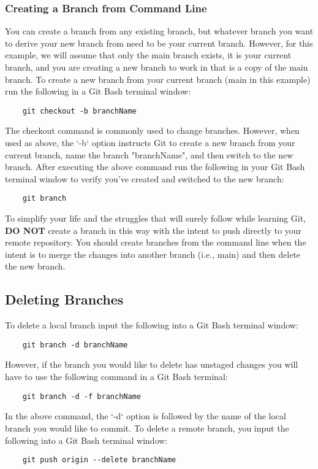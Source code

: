 \documentclass{article}
\begin{document}
\subsubsection*{Creating a Branch from Command Line}
You can create a branch from any existing branch, but whatever branch you want to derive your new branch from need to be your current branch. However, for this example, we will assume that only the main branch exists, it is your current branch, and you are creating a new branch to work in that is a copy of the main branch. To create a new branch from your current branch (main in this example) run the following in a Git Bash terminal window:
\begin{verbatim}
    git checkout -b branchName
\end{verbatim}
The checkout command is commonly used to change branches. However, when used as above, the `-b` option instructs Git to create a new branch from your current branch, name the branch "branchName", and then switch to the new branch. After executing the above command run the following in your Git Bash terminal window to verify you've created and switched to the new branch:
\begin{verbatim}
    git branch
\end{verbatim}
To simplify your life and the struggles that will surely follow while learning Git, \textbf{DO NOT} create a branch in this way with the intent to push directly to your remote repository. You should create branches from the command line when the intent is to merge the changes into another branch (i.e., main) and then delete the new branch. 

\subsection*{Deleting Branches}
To delete a local branch input the following into a Git Bash terminal window:
\begin{verbatim}
    git branch -d branchName
\end{verbatim}
However, if the branch you would like to delete has unstaged changes you will have to use the following command in a Git Bash terminal:
\begin{verbatim}
    git branch -d -f branchName
\end{verbatim}
In the above command, the `-d` option is followed by the name of the local branch you would like to commit. To delete a remote branch, you input the following into a Git Bash terminal window:
\begin{verbatim}
    git push origin --delete branchName
\end{verbatim}
\end{document}
